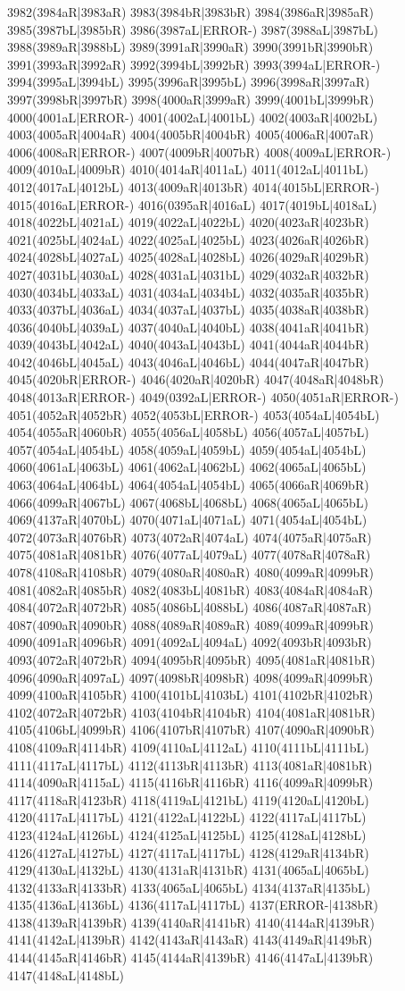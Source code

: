 3982(3984aR|3983aR) 3983(3984bR|3983bR) 3984(3986aR|3985aR) 3985(3987bL|3985bR) 3986(3987aL|ERROR-) 3987(3988aL|3987bL) 3988(3989aR|3988bL) 3989(3991aR|3990aR) 3990(3991bR|3990bR) 3991(3993aR|3992aR) 3992(3994bL|3992bR) 3993(3994aL|ERROR-) 3994(3995aL|3994bL) 3995(3996aR|3995bL) 3996(3998aR|3997aR) 3997(3998bR|3997bR) 3998(4000aR|3999aR) 3999(4001bL|3999bR) 4000(4001aL|ERROR-) 4001(4002aL|4001bL) 4002(4003aR|4002bL) 4003(4005aR|4004aR) 4004(4005bR|4004bR) 4005(4006aR|4007aR) 4006(4008aR|ERROR-) 4007(4009bR|4007bR) 4008(4009aL|ERROR-) 4009(4010aL|4009bR) 4010(4014aR|4011aL) 4011(4012aL|4011bL) 4012(4017aL|4012bL) 4013(4009aR|4013bR) 4014(4015bL|ERROR-) 4015(4016aL|ERROR-) 4016(0395aR|4016aL) 4017(4019bL|4018aL) 4018(4022bL|4021aL) 4019(4022aL|4022bL) 4020(4023aR|4023bR) 4021(4025bL|4024aL) 4022(4025aL|4025bL) 4023(4026aR|4026bR) 4024(4028bL|4027aL) 4025(4028aL|4028bL) 4026(4029aR|4029bR) 4027(4031bL|4030aL) 4028(4031aL|4031bL) 4029(4032aR|4032bR) 4030(4034bL|4033aL) 4031(4034aL|4034bL) 4032(4035aR|4035bR) 4033(4037bL|4036aL) 4034(4037aL|4037bL) 4035(4038aR|4038bR) 4036(4040bL|4039aL) 4037(4040aL|4040bL) 4038(4041aR|4041bR) 4039(4043bL|4042aL) 4040(4043aL|4043bL) 4041(4044aR|4044bR) 4042(4046bL|4045aL) 4043(4046aL|4046bL) 4044(4047aR|4047bR) 4045(4020bR|ERROR-) 4046(4020aR|4020bR) 4047(4048aR|4048bR) 4048(4013aR|ERROR-) 4049(0392aL|ERROR-) 4050(4051aR|ERROR-) 4051(4052aR|4052bR) 4052(4053bL|ERROR-) 4053(4054aL|4054bL) 4054(4055aR|4060bR) 4055(4056aL|4058bL) 4056(4057aL|4057bL) 4057(4054aL|4054bL) 4058(4059aL|4059bL) 4059(4054aL|4054bL) 4060(4061aL|4063bL) 4061(4062aL|4062bL) 4062(4065aL|4065bL) 4063(4064aL|4064bL) 4064(4054aL|4054bL) 4065(4066aR|4069bR) 4066(4099aR|4067bL) 4067(4068bL|4068bL) 4068(4065aL|4065bL) 4069(4137aR|4070bL) 4070(4071aL|4071aL) 4071(4054aL|4054bL) 4072(4073aR|4076bR) 4073(4072aR|4074aL) 4074(4075aR|4075aR) 4075(4081aR|4081bR) 4076(4077aL|4079aL) 4077(4078aR|4078aR) 4078(4108aR|4108bR) 4079(4080aR|4080aR) 4080(4099aR|4099bR) 4081(4082aR|4085bR) 4082(4083bL|4081bR) 4083(4084aR|4084aR) 4084(4072aR|4072bR) 4085(4086bL|4088bL) 4086(4087aR|4087aR) 4087(4090aR|4090bR) 4088(4089aR|4089aR) 4089(4099aR|4099bR) 4090(4091aR|4096bR) 4091(4092aL|4094aL) 4092(4093bR|4093bR) 4093(4072aR|4072bR) 4094(4095bR|4095bR) 4095(4081aR|4081bR) 4096(4090aR|4097aL) 4097(4098bR|4098bR) 4098(4099aR|4099bR) 4099(4100aR|4105bR) 4100(4101bL|4103bL) 4101(4102bR|4102bR) 4102(4072aR|4072bR) 4103(4104bR|4104bR) 4104(4081aR|4081bR) 4105(4106bL|4099bR) 4106(4107bR|4107bR) 4107(4090aR|4090bR) 4108(4109aR|4114bR) 4109(4110aL|4112aL) 4110(4111bL|4111bL) 4111(4117aL|4117bL) 4112(4113bR|4113bR) 4113(4081aR|4081bR) 4114(4090aR|4115aL) 4115(4116bR|4116bR) 4116(4099aR|4099bR) 4117(4118aR|4123bR) 4118(4119aL|4121bL) 4119(4120aL|4120bL) 4120(4117aL|4117bL) 4121(4122aL|4122bL) 4122(4117aL|4117bL) 4123(4124aL|4126bL) 4124(4125aL|4125bL) 4125(4128aL|4128bL) 4126(4127aL|4127bL) 4127(4117aL|4117bL) 4128(4129aR|4134bR) 4129(4130aL|4132bL) 4130(4131aR|4131bR) 4131(4065aL|4065bL) 4132(4133aR|4133bR) 4133(4065aL|4065bL) 4134(4137aR|4135bL) 4135(4136aL|4136bL) 4136(4117aL|4117bL) 4137(ERROR-|4138bR) 4138(4139aR|4139bR) 4139(4140aR|4141bR) 4140(4144aR|4139bR) 4141(4142aL|4139bR) 4142(4143aR|4143aR) 4143(4149aR|4149bR) 4144(4145aR|4146bR) 4145(4144aR|4139bR) 4146(4147aL|4139bR) 4147(4148aL|4148bL) 